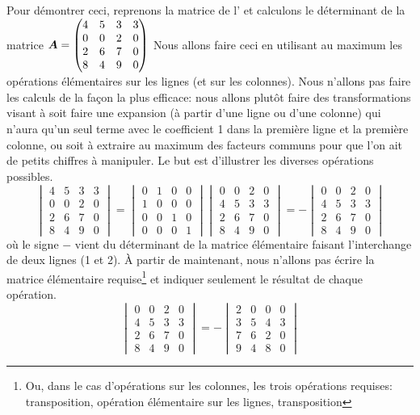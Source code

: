 Pour démontrer ceci, reprenons la matrice de
l'
et calculons le déterminant de la matrice $
\displaystyle\boldsymbol{A} = \begin{pmatrix}
4 & 5 & 3 & 3 \\
0 & 0 & 2 & 0 \\
2 & 6 & 7 & 0 \\
8 & 4 & 9 & 0
\end{pmatrix}
$
Nous allons faire ceci en utilisant au maximum les opérations élémentaires sur les lignes (et sur les colonnes).
Nous n'allons pas faire les calculs de la façon la plus efficace: nous allons plutôt faire des transformations
visant à soit faire une expansion (à partir d'une ligne ou d'une colonne) qui n'aura qu'un seul terme avec
le coefficient 1 dans la première ligne et la première colonne, ou soit à extraire au maximum des facteurs
communs pour que l'on ait de petits chiffres à manipuler.  Le but est d'illustrer les diverses opérations possibles.
\[
\begin{vmatrix}
4 & 5 & 3 & 3 \\
0 & 0 & 2 & 0 \\
2 & 6 & 7 & 0 \\
8 & 4 & 9 & 0
\end{vmatrix}
=
\begin{vmatrix}
0 & 1 & 0 & 0 \\
1 & 0 & 0 & 0 \\
0 & 0 & 1 & 0 \\
0 & 0 & 0 & 1
\end{vmatrix}
\begin{vmatrix}
0 & 0 & 2 & 0 \\
4 & 5 & 3 & 3 \\
2 & 6 & 7 & 0 \\
8 & 4 & 9 & 0
\end{vmatrix}
= - 
\begin{vmatrix}
0 & 0 & 2 & 0 \\
4 & 5 & 3 & 3 \\
2 & 6 & 7 & 0 \\
8 & 4 & 9 & 0
\end{vmatrix}
\]
où le signe $-$ vient du déterminant de la matrice élémentaire faisant l'interchange de deux lignes (1 et 2).  
À partir de maintenant, nous n'allons pas écrire la matrice élémentaire requise\footnote{Ou,
dans le cas d'opérations sur les colonnes, les trois opérations requises: 
transposition, opération élémentaire sur les lignes, transposition}
et indiquer seulement le résultat de chaque opération.
\[
\begin{vmatrix}
0 & 0 & 2 & 0 \\
4 & 5 & 3 & 3 \\
2 & 6 & 7 & 0 \\
8 & 4 & 9 & 0
\end{vmatrix}
= - 
\begin{vmatrix}
2& 0 & 0 & 0 \\
3& 5 & 4 & 3 \\
7& 6 & 2 & 0 \\
9& 4 & 8 & 0
\end{vmatrix}
\]
